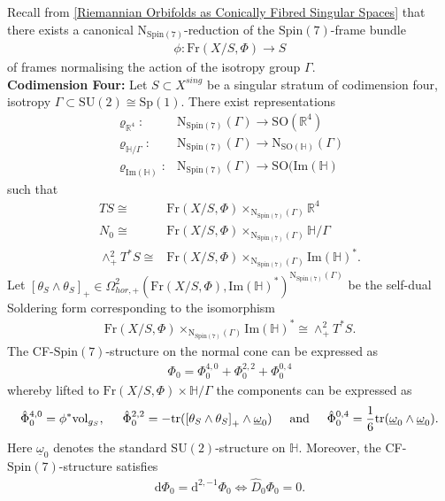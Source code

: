 \documentclass[psamsfonts]{amsart}
\theoremstyle{plain}
\theoremstyle{definition}{
\newtheorem{defi}{Definition}[section]
\newtheorem{ass}{Assumption}
\newtheorem*{nota}{Notation}}
\theoremstyle{remark}{
\newtheorem{rem}{Remark}
\newtheorem{ex}{Example}}
\theoremstyle{plain}{
\newtheorem{thm}{Theorem}[section]
\newtheorem{lem}{Lemma}[section]
\newtheorem{cor}{Corollary}[section]
\newtheorem{prop}{Proposition}[section]
\newtheorem{con}{Conjecture}[section]}
\newcommand{\m}[1]{{\mathrm{#1}}}
\newcommand{\und}[1]{\hspace{#1}\text{and}\hspace{#1}}
\begin{document}
Recall from \ref{Riemannian Orbifolds as Conically Fibred Singular Spaces} that there exists a canonical $\m{N}_{\m{Spin}(7)}$-reduction of the $\m{Spin}(7)$-frame bundle
\begin{align*}
    \phi\colon \m{Fr}(X/S,\Phi)\rightarrow S
\end{align*}
of frames normalising the action of the isotropy group $\Gamma$.\\


\textbf{Codimension Four:} Let $S\subset X^{sing}$ be a singular stratum of codimension four, isotropy $\Gamma\subset\m{SU}(2)\cong\m{Sp}(1)$. There exist representations 
\begin{align*}
    \varrho_{\mathbb{R}^4}\colon &\m{N}_{\m{Spin}(7)}(\Gamma)\rightarrow \m{SO}(\mathbb{R}^4)\\
    \varrho_{\mathbb{H}/\Gamma}\colon &\m{N}_{\m{Spin}(7)}(\Gamma)\rightarrow \m{N}_{\m{SO}(\mathbb{H})}(\Gamma)\\
    \varrho_{\m{Im}(\mathbb{H})}\colon &\m{N}_{\m{Spin}(7)}(\Gamma)\rightarrow \m{SO}(\m{Im}(\mathbb{H})
\end{align*}
such that 
\begin{align*}
    TS\cong&\m{Fr}(X/S,\Phi)\times_{\m{N}_{\m{Spin}(7)}(\Gamma)}\mathbb{R}^4\\
    N_0\cong& \m{Fr}(X/S,\Phi)\times_{\m{N}_{\m{Spin}(7)}(\Gamma)}\mathbb{H}/\Gamma\\
    \wedge^2_+T^* S\cong&\m{Fr}(X/S,\Phi) \times_{\m{N}_{\m{Spin}(7)}(\Gamma)}\m{Im}(\mathbb{H})^*.
\end{align*}
Let $\left[\theta_{S}\wedge\theta_S\right]_+\in\Omega^2_{hor,+}(\m{Fr}(X/S,\Phi),\m{Im}(\mathbb{H})^*)^{\m{N}_{\m{Spin}(7)}(\Gamma)}$ be the self-dual Soldering form corresponding to the isomorphism 
\begin{align*}
    \m{Fr}(X/S,\Phi)\times_{\m{N}_{\m{Spin}(7)}(\Gamma)}\m{Im}(\mathbb{H})^*\cong \wedge^2_+T^* S.
\end{align*}
The CF-$\m{Spin}(7)$-structure on the normal cone can be expressed as 
\begin{align*}
    \Phi_0=\Phi^{4,0}_0+\Phi^{2,2}_0+\Phi^{0,4}_0
\end{align*}
whereby lifted to $\m{Fr}(X/S,\Phi)\times \mathbb{H}/\Gamma$ the components can be expressed as
\begin{align*}
    \hat{\Phi}^{4,0}_0=\phi^*\m{vol}_{g_S},\hspace{0,5cm}\hat{\Phi}^{2,2}_0=-\m{tr}(\left[\theta_{S}\wedge\theta_S\right]_+\wedge\underline{\omega}_0)\und{0.5cm}\hat{\Phi}^{0,4}_0=\frac{1}{6}\m{tr}(\underline{\omega}_0\wedge\underline{\omega}_0).
\end{align*}
Here $\underline{\omega}_0$ denotes the standard $\m{SU}(2)$-structure on $\mathbb{H}$. Moreover, the CF-$\m{Spin}(7)$-structure satisfies 
\begin{align*}
    \m{d}\Phi_0=\m{d}^{2,-1}\Phi_0\Leftrightarrow \widehat{D}_{0}\Phi_0=0.
\end{align*}
\end{document}
